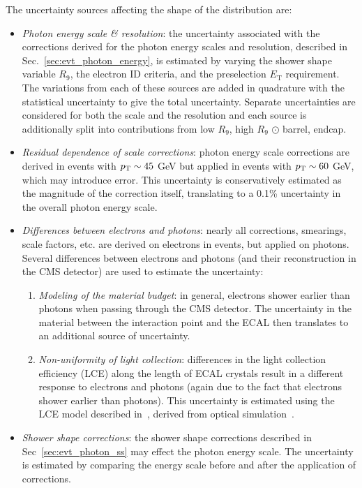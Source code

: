 The uncertainty sources affecting the shape of the \mgg distribution are:
\begin{itemize}
    \item \emph{Photon energy scale \& resolution}: the uncertainty associated with the corrections derived for the photon energy scales and resolution, described in Sec.~\ref{sec:evt_photon_energy}, is estimated by varying the shower shape variable $R_9$, the electron ID criteria, and the preselection $E_{\text{T}}$ requirement. The variations from each of these sources are added in quadrature with the statistical uncertainty to give the total uncertainty. Separate uncertainties are considered for both the scale and the resolution and each source is additionally split into contributions from {low $R_9$, high $R_9$} $\odot$ {barrel, endcap}.
    \item \emph{Residual \pT dependence of scale corrections}: photon energy scale corrections are derived in \Zee events with $p_{\mathrm{T}} \sim 45$ GeV but applied in \Hgg events with $p_{\mathrm{T}} \sim 60$ GeV, which may introduce error. This uncertainty is conservatively estimated as the magnitude of the correction itself, translating to a 0.1\% uncertainty in the overall photon energy scale.
    \item \emph{Differences between electrons and photons}: nearly all corrections, smearings, scale factors, etc. are derived on electrons in \Zee events, but applied on photons. Several differences between electrons and photons (and their reconstruction in the CMS detector) are used to estimate the uncertainty:
    \begin{enumerate}
        \item \emph{Modeling of the material budget}: in general, electrons shower earlier than photons when passing through the CMS detector. The uncertainty in the material between the interaction point and the ECAL then translates to an additional source of uncertainty.
        \item \emph{Non-uniformity of light collection}: differences in the light collection efficiency (LCE) along the length of ECAL crystals result in a different response to electrons and photons (again due to the fact that electrons shower earlier than photons). This uncertainty is estimated using the LCE model described in~\cite{Adams:2016viv}, derived from optical simulation~\cite{Gentit:2001ky}.
    \end{enumerate}
    \item \emph{Shower shape corrections}: the shower shape corrections described in Sec~\ref{sec:evt_photon_ss} may effect the photon energy scale. The uncertainty is estimated by comparing the energy scale before and after the application of corrections. 
\end{itemize}

